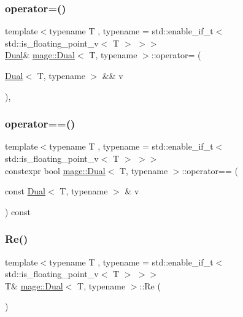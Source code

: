 \subsubsection{\texorpdfstring{operator=()}{operator=()}\hspace{0.1cm}{\footnotesize\ttfamily [2/2]}}
{\footnotesize\ttfamily template$<$typename T , typename  = std\+::enable\+\_\+if\+\_\+t$<$ std\+::is\+\_\+floating\+\_\+point\+\_\+v$<$ T $>$ $>$$>$ \\
\mbox{\hyperlink{structmage_1_1_dual}{Dual}}\& \mbox{\hyperlink{structmage_1_1_dual}{mage\+::\+Dual}}$<$ T, typename $>$\+::operator= (\begin{DoxyParamCaption}\item[{\mbox{\hyperlink{structmage_1_1_dual}{Dual}}$<$ T, typename $>$ \&\&}]{v }\end{DoxyParamCaption})\hspace{0.3cm}{\ttfamily [default]}, {\ttfamily [noexcept]}}

\mbox{\label{structmage_1_1_dual_a225d647abae8ed0fc046c123dae151e1}} 
\subsubsection{\texorpdfstring{operator==()}{operator==()}}
{\footnotesize\ttfamily template$<$typename T , typename  = std\+::enable\+\_\+if\+\_\+t$<$ std\+::is\+\_\+floating\+\_\+point\+\_\+v$<$ T $>$ $>$$>$ \\
constexpr bool \mbox{\hyperlink{structmage_1_1_dual}{mage\+::\+Dual}}$<$ T, typename $>$\+::operator== (\begin{DoxyParamCaption}\item[{const \mbox{\hyperlink{structmage_1_1_dual}{Dual}}$<$ T, typename $>$ \&}]{v }\end{DoxyParamCaption}) const}

\mbox{\label{structmage_1_1_dual_a4d4a35abe926e10556d7db5e2faa9207}} 
\subsubsection{\texorpdfstring{Re()}{Re()}\hspace{0.1cm}{\footnotesize\ttfamily [1/2]}}
{\footnotesize\ttfamily template$<$typename T , typename  = std\+::enable\+\_\+if\+\_\+t$<$ std\+::is\+\_\+floating\+\_\+point\+\_\+v$<$ T $>$ $>$$>$ \\
T\& \mbox{\hyperlink{structmage_1_1_dual}{mage\+::\+Dual}}$<$ T, typename $>$\+::Re (\begin{DoxyParamCaption}{ }\end{DoxyParamCaption})\hspace{0.3cm}{\ttfamily [noexcept]}}

